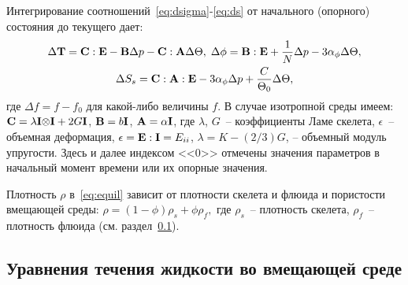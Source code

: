 %
Интегрирование соотношений~\eqref{eq:dsigma}-\eqref{eq:ds} от начального (опорного) состояния до текущего дает:
\begin{gather*}
\Delta\mathbf{T} = \mathbf{C}:\mathbf{E} - \mathbf{B} \Delta p - \mathbf{C}:\mathbf{A}\Delta \Theta,\;
\Delta \phi = \mathbf{B}:\mathbf{E} + \frac{1}{N} \Delta p - 3\alpha_\phi\Delta \Theta, \\
\Delta S_s = \mathbf{C} : \mathbf{A} : \mathbf{E} - 3\alpha_\phi \Delta p + \frac{C}{\Theta_0}\Delta\Theta,
\end{gather*}
%
где $\Delta f = f - f_0$ для какой-либо величины $f$.
В случае изотропной среды имеем:
%
$\mathbf{C} = \lambda \mathbf{I}\mathbf{\otimes} \mathbf{I} + 2G \mathbf{I}$,
$\mathbf{B} = b\mathbf{I}$, $\mathbf{A} = \alpha \mathbf{I}$,
%
%
где 
$\lambda$, $G$~-- коэффициенты Ламе скелета, 
$\epsilon$~-- объемная деформация,
%
\(
\epsilon = \mathbf{E}:\mathbf{I} = E_{ii}
\),
%
\(
\lambda = K - (2/3)G
\),
%
-- объемный модуль упругости.
Здесь и далее индексом <<$0$>> отмечены значения параметров в начальный момент времени или их опорные значения.


Плотность $\rho$ в~\eqref{eq:equil} 
зависит от плотности скелета и флюида и пористости вмещающей среды: 
%
\(
\rho = (1-\phi) \rho_s +  \phi \rho_f,
\)
%
где
$\rho_s$~-- плотность скелета,
$\rho_f$~-- плотность флюида (см. раздел~\ref{sec:fluid_flow}).

\subsection{Уравнения течения жидкости во вмещающей среде }\label{sec:fluid_flow}

